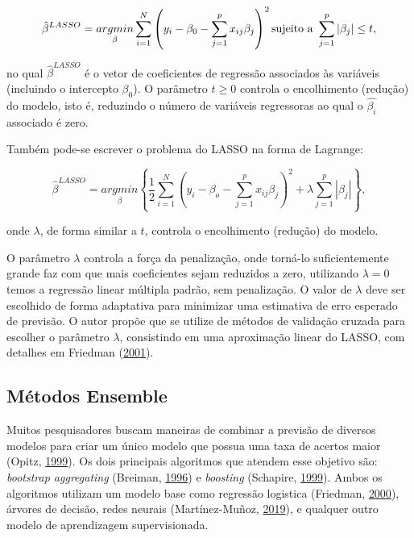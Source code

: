 \documentclass[
	12pt,				%
	a4paper,		%
	oneside,    %
	chapter=TITLE,		   %
	section=TITLE,		   %
	subsection=TITLE,	   %
	subsubsection=TITLE, %
	english,			%
	french,				%
	spanish,			%
	brazil,				%
]{abntex2}
\begin{document}
\[
\hat{\beta}^{LASSO} =\underset{\beta}{argmin}  \sum_{i=1}^N \left( y_i-\beta_0 -\sum_{j=1}^p x_{ij} \beta_j\right)^2 \hbox{sujeito a } \sum_{j=1}^p|\beta_j|\leq t,
\]

\noindent no qual \(\hat{\beta}^{LASSO}\) é o vetor de coeficientes de
regressão associados às variáveis (incluindo o intercepto \(\beta_0\)).
O parâmetro \(t\geq0\) controla o encolhimento (redução) do modelo, isto
é, reduzindo o número de variáveis regressoras ao qual o
\(\hat{\beta_i}\) associado é zero.

Também pode-se escrever o problema do LASSO na forma de Lagrange:

\[\hat{\beta}^{LASSO}=\underset{\beta}{argmin} \left\{ \frac{1}{2} \sum_{i=1}^N \left( y_i-\beta_o-\sum_{j=1}^px_{ij}\beta_j \right)^2 + \lambda\sum_{j=1}^p|\beta_j| \right\},\]

\noindent onde \(\lambda\), de forma similar a \(t\), controla o
encolhimento (redução) do modelo.

O parâmetro \(\lambda\) controla a força da penalização, onde torná-lo
suficientemente grande faz com que mais coeficientes sejam reduzidos a
zero, utilizando \(\lambda=0\) temos a regressão linear múltipla padrão,
sem penalização. O valor de \(\lambda\) deve ser escolhido de forma
adaptativa para minimizar uma estimativa de erro esperado de previsão. O
autor propõe que se utilize de métodos de validação cruzada para
escolher o parâmetro \(\lambda\), consistindo em uma aproximação linear
do LASSO, com detalhes em Friedman
(\protect\hyperlink{ref-friedman2001elements}{2001}).

\hypertarget{muxe9todos-ensemble}{%
\subsection{Métodos Ensemble}\label{muxe9todos-ensemble}}

Muitos pesquisadores buscam maneiras de combinar a previsão de diversos
modelos para criar um único modelo que possua uma taxa de acertos maior
(Opitz, \protect\hyperlink{ref-opitz1999popular}{1999}). Os dois
principais algoritmos que atendem esse objetivo são: \emph{bootstrap
aggregating} (Breiman, \protect\hyperlink{ref-breiman1996bagging}{1996})
e \emph{boosting} (Schapire,
\protect\hyperlink{ref-schapire1999brief}{1999}). Ambos os algoritmos
utilizam um modelo base como regressão logistica (Friedman,
\protect\hyperlink{ref-friedman2000additive}{2000}), árvores de decisão,
redes neurais (Martínez-Muñoz,
\protect\hyperlink{ref-martinez2019sequential}{2019}), e qualquer outro
modelo de aprendizagem supervisionada.
\end{document}
